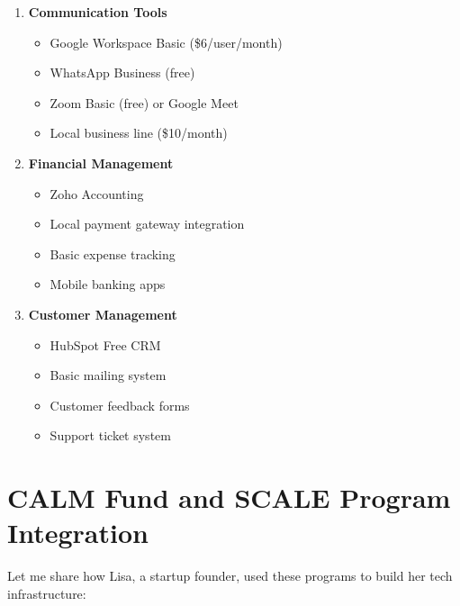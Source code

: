 \begin{enumerate}
    \item \textbf{Communication Tools}
    \begin{itemize}
        \item Google Workspace Basic (\$6/user/month)
        \item WhatsApp Business (free)
        \item Zoom Basic (free) or Google Meet
        \item Local business line (\$10/month)
    \end{itemize}

    \item \textbf{Financial Management}
    \begin{itemize}
        \item Zoho Accounting
        \item Local payment gateway integration
        \item Basic expense tracking
        \item Mobile banking apps
    \end{itemize}

    \item \textbf{Customer Management}
    \begin{itemize}
        \item HubSpot Free CRM
        \item Basic mailing system
        \item Customer feedback forms
        \item Support ticket system
    \end{itemize}
\end{enumerate}

\section{CALM Fund and SCALE Program Integration}\label{sec:funding-integration}

Let me share how Lisa, a startup founder, used these programs to build her tech infrastructure:

